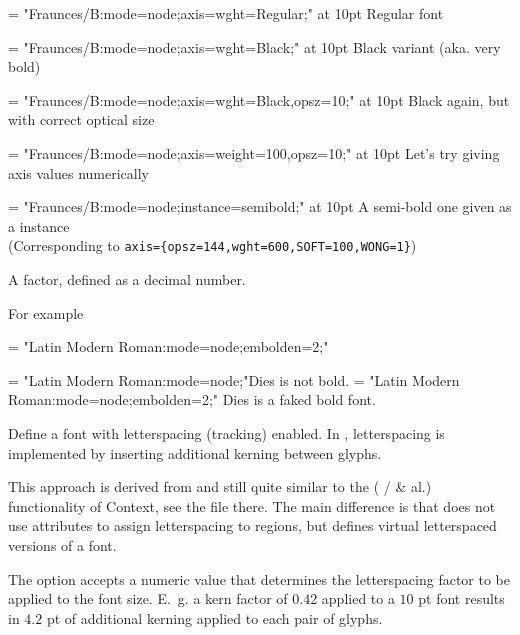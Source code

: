       {\def\fraunces#1#2{%
         \font\varfont = "Fraunces/B:mode=node;#1;" at #2pt\varfont
       }
       \fraunces{axis={wght=Regular}}{10}Regular font\par
       \fraunces{axis={wght=Black}}{10}Black variant (aka. very bold)\par
       \fraunces{axis={wght=Black,opsz=10}}{10}Black again, but with
       correct optical size\par
       \fraunces{axis={weight=100,opsz=10}}{10}Let's try giving axis values
       numerically\par
       \fraunces{instance=semibold}{10}A semi-bold one given as a
       instance\\
       (Corresponding to
       \verb|axis={opsz=144,wght=600,SOFT=100,WONG=1}|)\par
      }

  \endaltitem

         A factor, defined as a decimal number.

         For example

         \beginlisting
      \font\test = "Latin Modern Roman:mode=node;embolden=2;"
         \endlisting

      {\font\test= "Latin Modern Roman:mode=node;"\test Dies is not bold.
       \font\test= "Latin Modern Roman:mode=node;embolden=2;" \test Dies is a faked bold font.}

  \endaltitem

  \label{p:letterspace}
         Define a font with letterspacing (tracking) enabled.
         In , letterspacing is implemented by
         inserting additional kerning between glyphs.

         This approach is derived from and still quite similar to the
          ( /
          \& al.) functionality of
         Context, see the file  there.
         The main difference is that  does not
         use \LUATEX attributes to assign letterspacing to regions,
         but defines virtual letterspaced versions of a font.

         The option  accepts a numeric value that
         determines the letterspacing factor to be applied to the font
         size.
         E.~g. a kern factor of $0.42$ applied to a $10$ pt font
         results in $4.2$ pt of additional kerning applied to each
         pair of glyphs.

